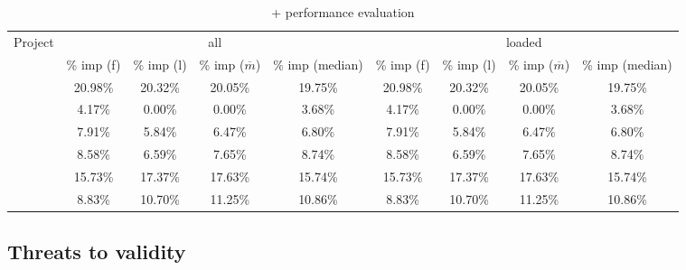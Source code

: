 \documentclass{article}
\begin{document}
\begin{table}[h]
	\centering
	\setlength{\tabcolsep}{2pt}
	\begin{tabular}{lcccccccc}
		\toprule
		
			    \multirow{2}{*}{Project}   & \multicolumn{4}{c}{all} & \multicolumn{4}{c}{loaded}  \\ 
		
		             & \% imp (f) &\% imp (l) & \% imp ($\overline{m}$)& \% imp (median) &\% imp (f) & \% imp (l)   & \% imp ($\overline{m}$) & \% imp (median)  \\ %
		\midrule
		
			\chart{}  & 20.98\% & 20.32\% & 20.05\% & 19.75\% & 20.98\% & 20.32\% & 20.05\% & 19.75\% \\
		\closure{}         & 4.17\% & 0.00\% & 0.00\% & 3.68\% & 4.17\% & 0.00\% & 0.00\% & 3.68\% \\
		\lang{}             &7.91\% & 5.84\% & 6.47\% & 6.80\% & 7.91\% & 5.84\% & 6.47\% & 6.80\% \\
			\cmath{}           &8.58\% & 6.59\% & 7.65\% & 8.74\% & 8.58\% & 6.59\% & 7.65\% & 8.74\% \\
		\mockito{} & 15.73\% & 17.37\% & 17.63\% & 15.74\% & 15.73\% & 17.37\% & 17.63\% & 15.74\% \\
		\jtime{}           & 8.83\% & 10.70\% & 11.25\% & 10.86\% & 8.83\% & 10.70\% & 11.25\% & 10.86\% \\
		\bottomrule
	\end{tabular}
	\caption {\sfl{}+\ds{} performance evaluation}
\end{table}
\normalsize

\subsection{Threats to validity}
\end{document}
